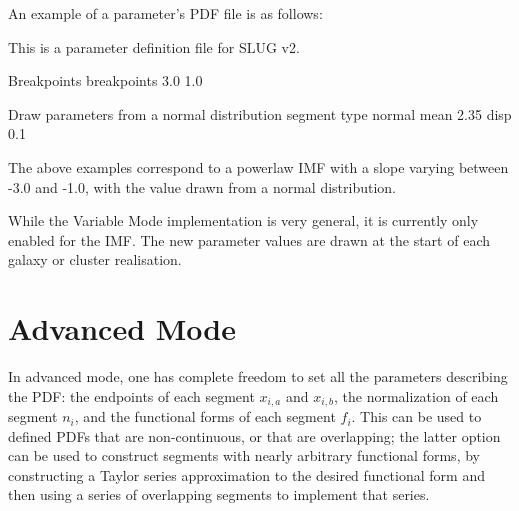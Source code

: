 \documentclass[letterpaper,10pt,english]{sphinxmanual}
\begin{document}
An example of a parameter’s PDF file is as follows:

\begin{sphinxVerbatim}[commandchars=\\\{\}]
\PYGZsh{}\PYGZsh{}\PYGZsh{}\PYGZsh{}\PYGZsh{}\PYGZsh{}\PYGZsh{}\PYGZsh{}\PYGZsh{}\PYGZsh{}\PYGZsh{}\PYGZsh{}\PYGZsh{}\PYGZsh{}\PYGZsh{}\PYGZsh{}\PYGZsh{}\PYGZsh{}\PYGZsh{}\PYGZsh{}\PYGZsh{}\PYGZsh{}\PYGZsh{}\PYGZsh{}\PYGZsh{}\PYGZsh{}\PYGZsh{}\PYGZsh{}\PYGZsh{}\PYGZsh{}\PYGZsh{}\PYGZsh{}\PYGZsh{}\PYGZsh{}\PYGZsh{}\PYGZsh{}\PYGZsh{}\PYGZsh{}\PYGZsh{}\PYGZsh{}\PYGZsh{}\PYGZsh{}\PYGZsh{}\PYGZsh{}\PYGZsh{}\PYGZsh{}\PYGZsh{}\PYGZsh{}\PYGZsh{}\PYGZsh{}\PYGZsh{}\PYGZsh{}\PYGZsh{}\PYGZsh{}\PYGZsh{}\PYGZsh{}\PYGZsh{}\PYGZsh{}\PYGZsh{}\PYGZsh{}\PYGZsh{}\PYGZsh{}\PYGZsh{}
\PYGZsh{} This is a parameter definition file for SLUG v2.

\PYGZsh{} Breakpoints
breakpoints \PYGZhy{}3.0 \PYGZhy{}1.0

\PYGZsh{} Draw parameters from a normal distribution
segment
type normal
mean \PYGZhy{}2.35
disp 0.1
\end{sphinxVerbatim}

The above examples correspond to a powerlaw IMF with a slope varying between -3.0 and -1.0, with the value drawn from a normal distribution.

While the Variable Mode implementation is very general, it is currently only enabled for the IMF. The new parameter values are drawn at the start of each galaxy or cluster realisation.


\section{Advanced Mode}
\label{\detokenize{pdfs:advanced-mode}}
In advanced mode, one has complete freedom to set all the parameters describing the PDF: the endpoints of each segment \(x_{i,a}\) and \(x_{i,b}\), the normalization of each segment \(n_i\), and the functional forms of each segment \(f_i\). This can be used to defined PDFs that are non-continuous, or that are overlapping; the latter option can be used to construct segments with nearly arbitrary functional forms, by constructing a Taylor series approximation to the desired functional form and then using a series of overlapping  segments to implement that series.
\end{document}
